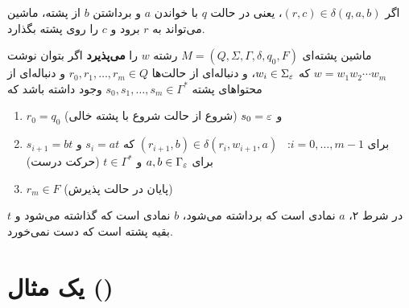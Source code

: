 اگر $(r,c)\in\delta(q,a,b)$، یعنی در حالت $q$ با خواندن $a$ و برداشتن $b$ از پشته، ماشین می‌تواند به $r$ برود و $c$ را روی پشته بگذارد.

\begin{definition}
ماشین پشته‌ای $M=(Q,\Sigma,\Gamma,\delta,q_0,F)$ رشته $w$ را \textbf{می‌پذیرد} اگر بتوان نوشت $w=w_1w_2\cdots w_m$ که $w_i\in\Sigma_\varepsilon$، و دنباله‌ای از حالت‌ها $r_0,r_1,\dots,r_m\in Q$ و دنباله‌ای از محتواهای پشته $s_0,s_1,\dots,s_m\in\Gamma^*$ وجود داشته باشد که
\begin{enumerate}
\item $r_0=q_0$ و $s_0=\varepsilon$ \hfill (شروع از حالت شروع با پشته خالی)
\item برای $i=0,\dots,m-1$: \ $(r_{i+1},b)\in\delta(r_i,w_{i+1},a)$ که $s_i=at$ و $s_{i+1}=bt$ برای $a,b\in\Gamma_\varepsilon$ و $t\in\Gamma^*$ \hfill (حرکت درست)
\item $r_m\in F$ \hfill (پایان در حالت پذیرش)
\end{enumerate}
\end{definition}

در شرط ۲، $a$ نمادی است که برداشته می‌شود، $b$ نمادی است که گذاشته می‌شود و $t$ بقیه پشته است که دست نمی‌خورد.

\section{یک مثال ()}


